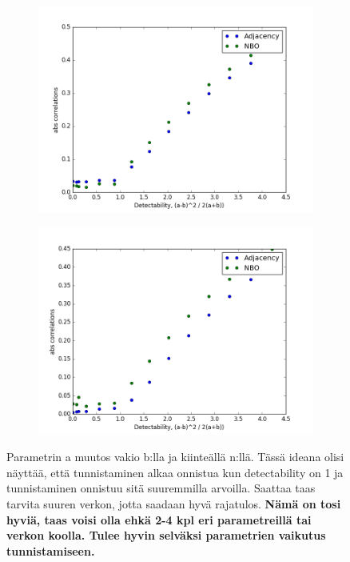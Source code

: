 \documentclass[finnish,12pt,a4paper,pdftex,sci,utf8]{aaltothesis}
\begin{document}
\begin{figure}
	\centering
	\begin{subfigure}[b]{0.45 \textwidth}
		\includegraphics[width = \textwidth]{detectability_a_1.png}
	\end{subfigure}
	\begin{subfigure}[b]{0.45 \textwidth}
		\includegraphics[width = \textwidth]{detectability_a_2.png}
	\end{subfigure}
	\caption{Parametrin a muutos vakio b:lla ja kiinteällä n:llä. Tässä ideana olisi näyttää, että tunnistaminen alkaa onnistua kun detectability on 1 ja tunnistaminen onnistuu sitä suuremmilla arvoilla. Saattaa taas tarvita suuren verkon, jotta saadaan hyvä rajatulos. \textbf{Nämä on tosi hyviä, taas voisi olla ehkä 2-4 kpl eri parametreillä tai verkon koolla. Tulee hyvin selväksi parametrien vaikutus tunnistamiseen.}}
	\label{fig:a_param}
\end{figure}
\end{document}
